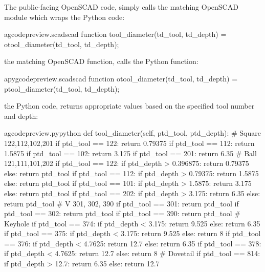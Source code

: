 \documentclass{ltxdoc}
\begin{document}
The public-facing OpenSCAD code,  simply calls the matching OpenSCAD module which wraps the Python code:
 
\lstset{firstnumber=\thegcpscad}
\begin{writecode}{a}{gcodepreview.scad}{scad}
function tool_diameter(td_tool, td_depth) = otool_diameter(td_tool, td_depth);

\end{writecode}
\addtocounter{gcpscad}{2}

\noindent the matching OpenSCAD function,  calls the Python function:

\lstset{firstnumber=\thepyscad}
\begin{writecode}{a}{pygcodepreview.scad}{scad}
function otool_diameter(td_tool, td_depth) = ptool_diameter(td_tool, td_depth);

\end{writecode}
\addtocounter{pyscad}{2}
 
\noindent the Python code,  returns 
appropriate values based on the specified tool number and depth:
 
\lstset{firstnumber=\thegcpy}
\begin{writecode}{a}{gcodepreview.py}{python}
    def tool_diameter(self, ptd_tool, ptd_depth):
# Square 122,112,102,201
        if ptd_tool == 122:
            return 0.79375
        if ptd_tool == 112:
            return 1.5875
        if ptd_tool == 102:
            return 3.175
        if ptd_tool == 201:
            return 6.35
# Ball 121,111,101,202
        if ptd_tool == 122:
            if ptd_depth > 0.396875:
                return 0.79375
            else:
                return ptd_tool
        if ptd_tool == 112:
            if ptd_depth > 0.79375:
                return 1.5875
            else:
                return ptd_tool
        if ptd_tool == 101:
            if ptd_depth > 1.5875:
                return 3.175
            else:
                return ptd_tool
        if ptd_tool == 202:
            if ptd_depth > 3.175:
                return 6.35
            else:
                return ptd_tool
# V 301, 302, 390
        if ptd_tool == 301:
            return ptd_tool
        if ptd_tool == 302:
            return ptd_tool
        if ptd_tool == 390:
            return ptd_tool
# Keyhole
        if ptd_tool == 374:
            if ptd_depth < 3.175:
                return 9.525
            else:
                return 6.35
        if ptd_tool == 375:
            if ptd_depth < 3.175:
                return 9.525
            else:
                return 8
        if ptd_tool == 376:
            if ptd_depth < 4.7625:
                return 12.7
            else:
                return 6.35
        if ptd_tool == 378:
            if ptd_depth < 4.7625:
                return 12.7
            else:
                return 8
# Dovetail
        if ptd_tool == 814:
            if ptd_depth > 12.7:
                return 6.35
            else:
                return 12.7

\end{writecode}
\addtocounter{gcpy}{66}
\end{document}
